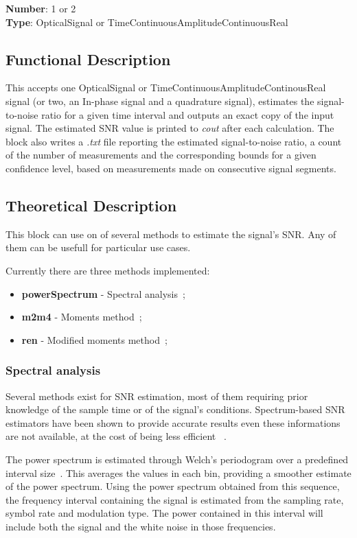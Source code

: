 \begin{refsection}
\textbf{Number}: 1 or 2\\
\textbf{Type}: OpticalSignal or TimeContinuousAmplitudeContinuousReal

\subsection*{Functional Description}
This  accepts one OpticalSignal or TimeContinuousAmplitudeContinousReal signal
(or two, an In-phase signal and a quadrature signal), estimates the
signal-to-noise ratio for a given time interval and outputs an exact copy of the
input signal. The estimated SNR value is printed to \textit{cout} after each
calculation.  The block also writes a \textit{.txt} file reporting the estimated
signal-to-noise ratio, a count of the number of measurements and the
corresponding bounds for a given confidence level, based on measurements made on
consecutive signal segments.


\subsection*{Theoretical Description}\label{snrcalc}
This block can use on of several methods to estimate the signal's SNR. Any of
them can be usefull for particular use cases.

Currently there are three methods implemented:

\begin{itemize}
	\item \textbf{powerSpectrum} - Spectral
		analysis~\cite{harris12,xiao10,kashefi12};
	\item \textbf{m2m4} - Moments method~\cite{matzner93};
	\item \textbf{ren} - Modified moments method~\cite{ren05};
\end{itemize}

\subsubsection*{Spectral analysis}
Several methods exist for SNR estimation, most of them requiring prior
knowledge of the sample time or of the signal's conditions. Spectrum-based SNR
estimators have been shown to provide accurate results even these informations
are not available, at the cost of being less efficient ~\cite{harris12,xiao10,kashefi12}. 


The power spectrum is estimated through Welch's periodogram over a predefined
interval size~\cite{john2007digital}. This averages the values in each bin,
providing a smoother estimate of the power spectrum.
Using the power spectrum obtained from this sequence, the frequency interval
containing the signal is estimated from the sampling rate, symbol rate and
modulation type. The power contained in this interval will include both the signal
and the white noise in those frequencies.


\end{refsection}
